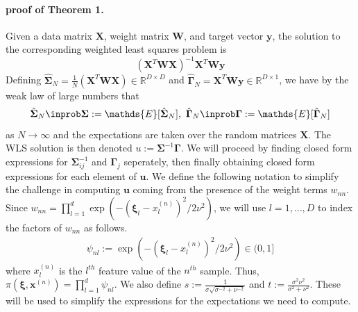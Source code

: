     \paragraph{proof of Theorem 1.}
            Given a data matrix $\mathbf{X}$, weight matrix $\mathbf{W}$, and target vector $\mathbf{y}$, the solution to the corresponding weighted least squares problem is
            \begin{equation*}
                (\mathbf{X}^T \mathbf{W} \mathbf{X})^{-1} \mathbf{X}^T \mathbf{W}\mathbf{y}
            \end{equation*}
            Defining $\hat{\mathbf{\Sigma}}_N = \frac{1}{N}(\mathbf{X}^T \mathbf{W} \mathbf{X}) \in \mathbb{R}^{D\times D}$ and $\hat{\mathbf{\Gamma}}_N = \mathbf{X}^T \mathbf{W}\mathbf{y}\in \mathbb{R}^{D \times 1}$, we have by the weak law of large numbers that 
            \begin{equation*}
                \hat{\mathbf{\Sigma}}_N \inprob \mathbf{\Sigma} := \mathds{E}[\hat{\mathbf{\Sigma}}_N],\ \hat{\mathbf{\Gamma}}_N \inprob \mathbf{\Gamma} := \mathds{E}[\hat{\mathbf{\Gamma}}_N] 
            \end{equation*}
            as $N\rightarrow \infty$ and the expectations are taken over the random matrices $\mathbf{X}$. 
            The WLS solution is then denoted $u := \mathbf{\Sigma}^{-1}\mathbf{\Gamma}$. We will proceed by finding closed form expressions for $\mathbf{\Sigma}_{ij}^{-1}$ and $\mathbf{\Gamma}_j$ seperately, then finally obtaining closed form expressions for each element of $\mathbf{u}$. We define the following notation to simplify the challenge in computing $\mathbf{u}$ coming from the presence of the weight terms $w_{nn}$. Since $w_{nn}=\prod_{l=1}^d \exp(-(\mathbf{\xi}_l - x^{(n)}_l)^2/2\nu^2)$, we will use $l=1,\ldots,D$ to index the factors of $w_{nn}$ as follows.
            \begin{gather*}
                \psi_{nl} := \exp(-(\mathbf{\xi}_l - x^{(n)}_l)^2/2\nu^2) \in (0,1]
            \end{gather*}
            where $x^{(n)}_l$ is the $l^{th}$ feature value of the $n^{th}$ sample. 
            Thus, $\pi(\mathbf{\xi},\mathbf{x}^{(n)}) = \prod_{l=1}^d \psi_{nl}$. We also define $s:= \frac{1}{\sigma\sqrt{\sigma^{-2} + \nu^{-2}}}$ and $t := \frac{\sigma^2 \nu^2}{\sigma^2 + \nu^2}$. These will be used to simplify the expressions for the expectations we need to compute. 
            
